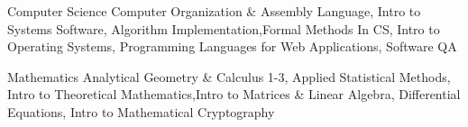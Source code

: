 
\vspace{0mm}
\begin{cvskills}

  \vspace{1mm}

  \cvskill
    {Computer Science} %
    {Computer Organization \& Assembly Language, Intro to Systems Software, Algorithm Implementation,\newline Formal Methods In CS, Intro to Operating Systems, Programming Languages for Web Applications, Software QA} %

   \cvskill
    {Mathematics} %
	{Analytical Geometry \& Calculus 1-3, Applied Statistical Methods, Intro to Theoretical Mathematics,\newline Intro to Matrices \& Linear Algebra, Differential Equations, Intro to Mathematical Cryptography} %

  \vspace{-4mm}

\end{cvskills}
